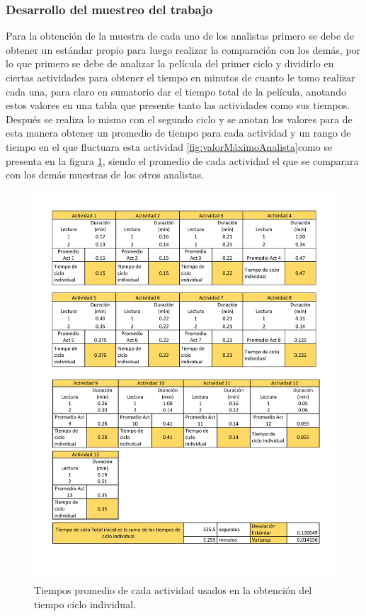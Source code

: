   \subsubsection{Desarrollo del muestreo del trabajo}
Para la obtención de la muestra de cada uno de los analistas primero se debe de obtener un estándar propio para luego realizar la comparación con los demás, por lo que primero se debe de analizar la película del primer ciclo y dividirlo en ciertas actividades para obtener el tiempo en minutos de cuanto le tomo realizar cada una, para claro en sumatorio dar el tiempo total de la película, anotando estos valores en una tabla que presente tanto las actividades como sus tiempos. Después se realiza lo mismo con el segundo ciclo y se anotan los valores para de esta manera obtener un promedio de tiempo para cada actividad y un rango de tiempo en el que fluctuara esta actividad \ref{fig:valorMáximoAnalista}como se presenta en la figura \ref{fig:tiemposAnalista}, siendo el promedio de cada actividad el que se comparara con los demás muestras de los otros analistas.
                \begin{figure}[H]
        \centering
        \includegraphics[trim = {1mm 10mm 1mm 1mm},clip,scale=0.4]{19/Img/tiemposAnalista.pdf}
        \newpage
        \caption{Tiempos promedio de cada actividad  usados en la obtención del tiempo ciclo individual.}
        \label{fig:tiemposAnalista}    
    \end{figure}
